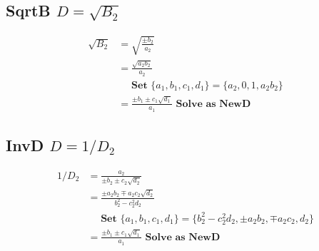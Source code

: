 \documentclass{article}
\begin{document}
\subsection{SqrtB $D = \sqrt{B_2}$}
\begin{align}
\sqrt{B_2} &= \sqrt{\frac{\pm b_2}{a_2}}\\
 &= \frac{\sqrt{a_2b_2}}{a_2}\\
 &\quad \textbf{ Set } \{ a_1, b_1, c_1, d_1\} = \{ a_2, 0, 1, a_2b_2\} \nonumber \\
 &= \frac{\pm b_1 \pm c_1\sqrt{d_1}}{a_1} \textbf{ Solve as NewD }
\end{align}

\subsection{InvD $D = 1 / D_2$}
\begin{align*}
1 / D_2 &= \frac{a_2}{\pm b_2 \pm c_2\sqrt{d_2}} \\
 &= \frac{\pm a_2b_2 \mp a_2c_2\sqrt{d_2}}{b_2^2 - c_2^2d_2}\\
 &\quad \textbf{ Set } \{ a_1, b_1, c_1, d_1\} = \{ b_2^2 - c_2^2d_2, \pm a_2b_2, \mp a_2c_2, d_2\} \nonumber\\
 &= \frac{\pm b_1 \pm c_1\sqrt{d_1}}{a_1} \textbf{ Solve as NewD } \nonumber
\end{align*}



\end{document}
